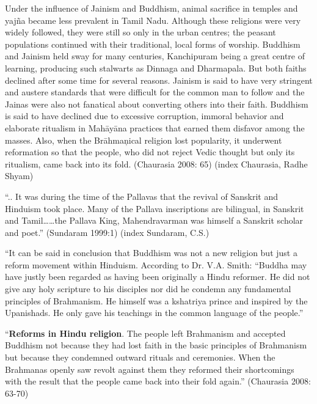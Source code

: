 Under the influence of Jainism and Buddhism, animal sacrifice in temples and yajña became less prevalent in Tamil Nadu. Although these religions were very widely followed, they were still so only in the urban centres; the peasant populations continued with their traditional, local forms of worship. Buddhism and Jainism held sway for many centuries, Kanchipuram being a great centre of learning, producing such stalwarts as Dinnaga and Dharmapala. But both faiths declined after some time for several reasons. Jainism is said to have very stringent and austere standards that were difficult for the common man to follow and the Jainas were also not fanatical about converting others into their faith. Buddhism is said to have declined due to excessive corruption, immoral behavior and elaborate ritualism in Mahāyāna practices that earned them disfavor among the masses. Also, when the Brāhmaņical religion lost popularity, it underwent reformation so that the people, who did not reject Vedic thought but only its ritualism, came back into its fold. (Chaurasia 2008: 65) (index Chaurasia, Radhe Shyam)

\begin{myquote}
“.. It was during the time of the Pallavas that the revival of Sanskrit and Hinduism took place. Many of the Pallava inscriptions are bilingual, in Sanskrit and Tamil……the Pallava King, Mahendravarman was himself a Sanskrit scholar and poet.” (Sundaram 1999:1) (index Sundaram, C.S.)
\end{myquote}

\begin{myquote}
“It can be said in conclusion that Buddhism was not a new religion but just a reform movement within Hinduism. According to Dr. V.A. Smith: “Buddha may have justly been regarded as having been originally a Hindu reformer. He did not give any holy scripture to his disciples nor did he condemn any fundamental principles of Brahmanism. He himself was a kshatriya prince and inspired by the Upanishads. He only gave his teachings in the common language of the people.”
\end{myquote}

\begin{myquote}
“\textbf{Reforms in Hindu religion}. The people left Brahmanism and accepted Buddhism not because they had lost faith in the basic principles of Brahmanism but because they condemned outward rituals and ceremonies. When the Brahmanas openly saw revolt against them they reformed their shortcomings with the result that the people came back into their fold again.” (Chaurasia 2008: 63-70)
\end{myquote}

